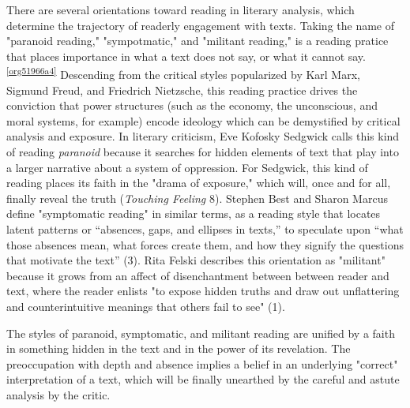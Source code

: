 \documentclass[11pt]{article}
\begin{document}
There are several orientations toward reading in literary analysis,
which determine the trajectory of readerly engagement with
texts. Taking the name of "paranoid reading," "sympotmatic," and
"militant reading," is a reading pratice that places importance in
what a text does not say, or what it cannot say.\textsuperscript{\ref{org51966a4}} Descending from
the critical styles popularized by Karl Marx, Sigmund Freud, and
Friedrich Nietzsche, this reading practice drives the conviction that
power structures (such as the economy, the unconscious, and moral
systems, for example) encode ideology which can be demystified by
critical analysis and exposure. In literary criticism, Eve Kofosky
Sedgwick calls this kind of reading \emph{paranoid} because it searches for
hidden elements of text that play into a larger narrative about a
system of oppression. For Sedgwick, this kind of reading places its
faith in the "drama of exposure," which will, once and for all,
finally reveal the truth (\emph{Touching Feeling} 8). Stephen Best and
Sharon Marcus define "symptomatic reading" in similar terms, as a
reading style that locates latent patterns or “absences, gaps, and
ellipses in texts,” to speculate upon “what those absences mean, what
forces create them, and how they signify the questions that motivate
the text” (3). Rita Felski describes this orientation as "militant"
because it grows from an affect of disenchantment between between
reader and text, where the reader enlists "to expose hidden truths and
draw out unflattering and counterintuitive meanings that others fail
to see" (1).

The styles of paranoid, symptomatic, and militant reading are unified
by a faith in something hidden in the text and in the power of its
revelation. The preoccupation with depth and absence implies a belief
in an underlying "correct" interpretation of a text, which will be
finally unearthed by the careful and astute analysis by the critic. 
\end{document}
